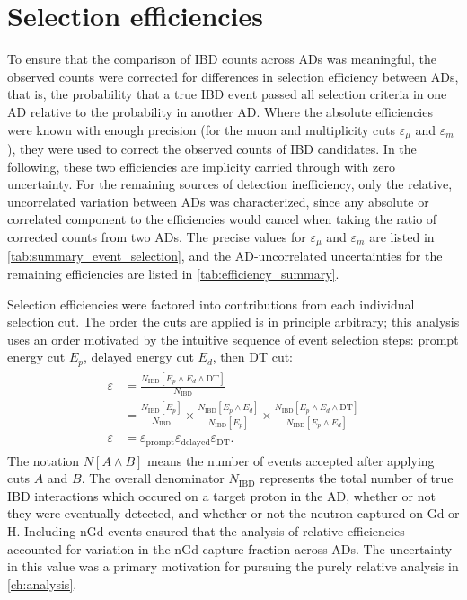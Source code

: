 \section{Selection efficiencies}
\label{sec:efficiencies}

To ensure that the comparison of IBD counts across ADs was meaningful,
the observed counts were corrected
for differences in selection efficiency between ADs,
that is, the probability that a true IBD event
passed all selection criteria in one AD
relative to the probability in another AD.
Where the absolute efficiencies were known with enough precision
(for the muon and multiplicity cuts $\varepsilon_\mu$ and $\varepsilon_m$),
they were used to correct the observed counts of IBD candidates.
In the following, these two efficiencies are implicity carried through
with zero uncertainty.
For the remaining sources of detection inefficiency,
only the relative, uncorrelated variation between ADs was characterized,
since any absolute or correlated component to the efficiencies
would cancel when taking the ratio of corrected counts from two ADs.
The precise values for $\varepsilon_\mu$ and $\varepsilon_m$
are listed in \cref{tab:summary_event_selection},
and the AD-uncorrelated uncertainties for the remaining efficiencies
are listed in \cref{tab:efficiency_summary}.

Selection efficiencies were factored into
contributions from each individual selection cut.
The order the cuts are applied is in principle arbitrary;
this analysis uses an order
motivated by the intuitive sequence of event selection steps:
prompt energy cut $E_p$, delayed energy cut $E_d$, then DT cut:
\begin{align}\label{eq:efficiency_def}
    \begin{split}
        \varepsilon &= \frac{N_\text{IBD}[E_p \wedge E_d \wedge \text{DT}]}{
            N_\text{IBD}
        } \\
                    &= \frac{N_\text{IBD}[E_p]}{N_\text{IBD}} \times
                    \frac{N_\text{IBD}[E_p \wedge E_d]}{
                        N_\text{IBD}[E_p]
                    } \times
                    \frac{N_\text{IBD}[E_p \wedge E_d \wedge \text{DT}]}{
                        N_\text{IBD}[E_p \wedge E_d]
                    } \\
        \varepsilon &= \varepsilon_\text{prompt}\varepsilon_\text{delayed}
        \varepsilon_\text{DT}.
    \end{split}
\end{align}
The notation $N[A \wedge B]$ means
the number of events accepted after applying cuts $A$ and $B$.
The overall denominator $N_\text{IBD}$
represents the total number of true IBD interactions
which occured on a target proton in the AD,
whether or not they were eventually detected,
and whether or not the neutron captured on Gd or H.
Including nGd events ensured that the analysis of relative efficiencies
accounted for variation in the nGd capture fraction across ADs.
The uncertainty in this value was a primary motivation
for pursuing the purely relative analysis in \cref{ch:analysis}.

